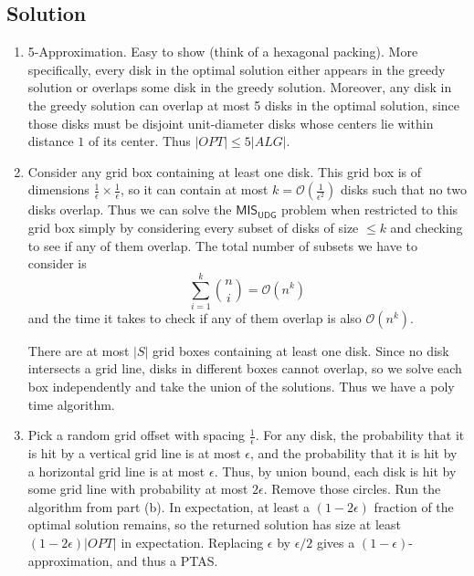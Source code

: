 \documentclass{article}
\begin{document}
\subsection*{Solution}
    \begin{enumerate}
        \item 5-Approximation. Easy to show (think of a hexagonal packing). More specifically, every disk in the optimal solution either appears in the greedy solution or overlaps some disk in the greedy solution. Moreover, any disk in the greedy solution can overlap at most 5 disks in the optimal solution, since those disks must be disjoint unit-diameter disks whose centers lie within distance $1$ of its center. Thus $|OPT| \le 5|ALG|$.

        \item Consider any grid box containing at least one disk. This grid box is of dimensions $\frac{1}{\epsilon} \times \frac{1}{\epsilon}$, so it can contain at most $k = \mathcal{O}\left(\frac{1}{\epsilon^{2}}\right)$ disks such that no two disks overlap. Thus we can solve the $\textsf{MIS}_{\textsf{UDG}}$ problem when restricted to this grid box simply by considering every subset of disks of size $\le k$ and checking to see if any of them overlap. The total number of subsets we have to consider is $$\sum_{i = 1}^{k} \binom{n}{i} = \mathcal{O}(n^{k})$$ and the time it takes to check if any of them overlap is also $\mathcal{O}(n^{k})$.

        \vspace{3mm}
        There are at most $|S|$ grid boxes containing at least one disk. Since no disk intersects a grid line, disks in different boxes cannot overlap, so we solve each box independently and take the union of the solutions. Thus we have a poly time algorithm.

        \item Pick a random grid offset with spacing $\frac{1}{\epsilon}$. For any disk, the probability that it is hit by a vertical grid line is at most $\epsilon$, and the probability that it is hit by a horizontal grid line is at most $\epsilon$. Thus, by union bound, each disk is hit by some grid line with probability at most $2\epsilon$. Remove those circles. Run the algorithm from part (b). In expectation, at least a $(1 - 2\epsilon)$ fraction of the optimal solution remains, so the returned solution has size at least $(1 - 2\epsilon)|OPT|$ in expectation. Replacing $\epsilon$ by $\epsilon/2$ gives a $(1 - \epsilon)$-approximation, and thus a PTAS.
    \end{enumerate}
\end{document}
